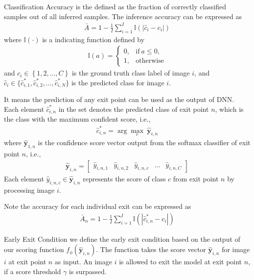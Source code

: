 \begin{enumdescript}
	\item[Classification Accuracy] is the defined as the fraction of correctly classified samples out of all inferred samples. The inference accuracy can be expressed as
	\begin{align}
	\bar{A}=1-\frac{1}{I} \sum_{i=1}^{I} \mathbb{I}\left(\left|\hat{c}_{i}-c_{i}\right|\right) \label{eq:accuracy}
	\end{align}
	where $ \mathbb{I(\cdot)}  $ is a indicating function defined by
	\begin{align}
	\mathbb{I}(a)= \begin{cases}
	0, & \mathrm{if\:} a \leq 0, \\
	1, & \mathrm{otherwise}
	\end{cases} \label{eq:indicator}
	\end{align}
	and $ c_i \in \left\{1, 2, \dots, C \right\} $ is the ground truth class label of image $ i $, and $  \hat{c}_i \in \{\hat{c}^*_{i,1} , \hat{c}^*_{i,2}, \dots, \hat{c}^*_{i,N} \} $ is the predicted class for image $ i $. 
	
	It means the prediction of any exit point can be used as the output of DNN. Each element $ \hat{c}^*_{i,n} $ in the set denotes the predicted class of exit point $ n $, which is the class with the maximum confident score, i.e.,
	\begin{align}
	\hat{c}^*_{i,n} = \arg \underset{c}{\max}\: \bm{\hat{y}}_{i,n}
	\end{align}
	where $ \bm{\hat{y}}_{1,n} $ is the confidence score vector output from the softmax classifier of exit point $ n $, i.e.,
	\begin{align}
	\bm{\hat{y}}_{i,n} = \left[\begin{array}{ccccc}\hat{y}_{i,n,1} & \hat{y}_{i,n,2} & \hat{y}_{i,n,c} & \dots & \hat{y}_{i,n,C}\end{array}\right]
	\end{align}
	Each element $ \hat{y}_{i,n,c} \in \bm{\hat{y}}_{i,n} $ represents the score of class $ c $ from exit point $ n $ by processing image $ i $.
	
	Note the accuracy for each individual exit can be expressed as
	\begin{align}
	\bar{A}_n=1-\frac{1}{I} \sum_{i=1}^{I} \mathbb{I}\left(\left|\hat{c}^*_{i,n}-c_{i}\right|\right)
	\end{align}
	
	\item[Early Exit Condition] we define the early exit condition based on the output of our scoring function $ f_\phi(\bm{\hat{y}}_{i,n}) $. The function takes the score vector $ \bm{\hat{y}}_{i,n} $ for image $ i $ at exit point $ n $ as input. An image $ i $ is allowed to exit the model at exit point $ n $, if a score threshold $ \gamma $ is surpassed. 
	

\end{enumdescript}
